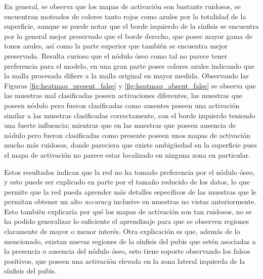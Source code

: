 En general, se observa que los mapas de activación son bastante ruidosos, se encuentran moteados de colores tanto rojos como azules por la totalidad de la superficie, aunque se puede notar que el borde izquierdo de la sínfisis se encuentra por lo general mejor preservado que el borde derecho, que posee mayor gama de tonos azules, así como la parte superior que también se encuentra mejor preservada. Resulta curioso que el nódulo óseo como tal no parece tener preferencia para el modelo, en una gran parte posee colores azules indicando que la malla procesada difiere a la malla original en mayor medida. Observando las Figuras \ref{fig:heatmap_present_false} y \ref{fig:heatmap_absent_false} se observa que las muestras mal clasificadas poseen activaciones diferentes, las muestras que poseen nódulo pero fueron clasificadas como ausentes poseen una activación similar a las muestras clasificadas correctamente, con el borde izquierdo teniendo una fuerte influencia; mientras que en las muestras que poseen ausencia de nódulo pero fueron clasificadas como presente poseen unos mapas de activación mucho más ruidosos, donde pareciera que existe ambigüedad en la superficie pues el mapa de activación no parece estar localizado en ninguna zona en particular.

Estos resultados indican que la red no ha tomado preferencia por el nódulo óseo, y esto puede ser explicado en parte por el tamaño reducido de los datos, lo que permite que la red pueda aprender más detalles específicos de las muestras que le permitan obtener un alto \textit{accuracy} inclusive en muestras no vistas anteriormente. Esto también explicaría por qué los mapas de activación son tan ruidosos, no se ha podido generalizar lo suficiente el aprendizaje para que se observen regiones claramente de mayor o menor interés. Otra explicación es que, además de lo mencionado, existan nuevas regiones de la sínfisis del pubis que estén asociadas a la presencia o ausencia del nódulo óseo, esto tiene soporte observando los falsos positivos, que poseen una activación elevada en la zona lateral izquierda de la sínfisis del pubis.

